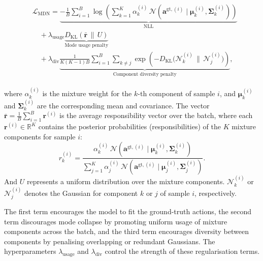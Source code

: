 \documentclass[journal]{IEEEtran}
\begin{document}
\begin{align}
\begin{split}
&\mathcal{L}_{\text{MDN}} = 
\underbrace{- \frac{1}{B} \sum_{i=1}^{B} \log \left( \sum_{k=1}^{K} 
    \alpha_k^{(i)} \,
    \mathcal{N}\!\left(\mathbf{a}^{\text{gt},(i)} \mid \boldsymbol{\mu}_k^{(i)}, \boldsymbol{\Sigma}_k^{(i)} \right) \right)}_{\text{NLL}} \\
&\quad+ 
\lambda_{\text{usage}} \underbrace{D_{\mathrm{KL}}\!\left( \bar{\mathbf{r}} \,\|\, U \right)}_{\text{Mode usage penalty}} \\
&\quad+
\lambda_{\text{div}} \underbrace{\frac{1}{K(K-1)B} \sum_{i=1}^{B} \sum_{k \neq j} \exp\!\left(- D_{\mathrm{KL}}\big( \mathcal{N}_k^{(i)} \,\|\, \mathcal{N}_j^{(i)} \big) \right)}_{\text{Component diversity penalty}},
\end{split}
\end{align}

where $\alpha_k^{(i)}$ is the mixture weight for the $k$-th component of sample $i$, and $\boldsymbol{\mu}_k^{(i)}$ and $\boldsymbol{\Sigma}_k^{(i)}$ are the corresponding mean and covariance. The vector $\bar{\mathbf{r}} = \frac{1}{B} \sum_{i=1}^{B} \mathbf{r}^{(i)}$ is the average responsibility vector over the batch, where each $\mathbf{r}^{(i)} \in \mathbb{R}^K$ contains the posterior probabilities (responsibilities) of the $K$ mixture components for sample $i$:
\begin{equation}
r_k^{(i)} = \frac{\alpha_k^{(i)} \, \mathcal{N}(\mathbf{a}^{\text{gt},(i)} \mid \boldsymbol{\mu}_k^{(i)}, \boldsymbol{\Sigma}_k^{(i)})}{\sum_{j=1}^{K} \alpha_j^{(i)} \, \mathcal{N}(\mathbf{a}^{\text{gt},(i)} \mid \boldsymbol{\mu}_j^{(i)}, \boldsymbol{\Sigma}_j^{(i)})}.
\end{equation}
And $U$ represents a uniform distribution over the mixture components. $\mathcal{N}_k^{(i)}$ or $\mathcal{N}_j^{(i)}$ denotes the Gaussian for component $k$ or $j$ of sample $i$, respectively.

The first term encourages the model to fit the ground-truth actions, the second term discourages mode collapse by promoting uniform usage of mixture components across the batch, and the third term encourages diversity between components by penalising overlapping or redundant Gaussians. The hyperparameters $\lambda_{\text{usage}}$ and $\lambda_{\text{div}}$ control the strength of these regularisation terms.
\end{document}
